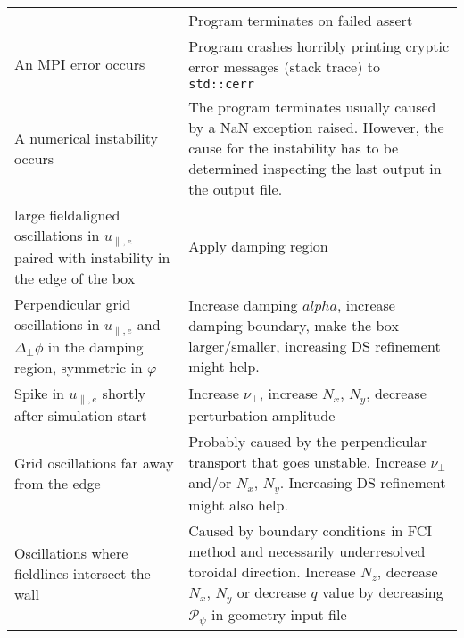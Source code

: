 \begin{longtable}{p{6cm}p{8cm}}
&
Program terminates on failed assert
    \\
An MPI error occurs
&
Program crashes horribly printing cryptic error messages (stack trace) to \texttt{std::cerr}
    \\
A numerical instability occurs
&
The program terminates usually caused by a NaN exception raised. However,
the cause for the instability has to be determined inspecting the
last output in the output file.
    \\
\qquad large fieldaligned oscillations in $u_{\parallel,e}$ paired with instability in the edge of the box
&
Apply damping region
    \\
\qquad Perpendicular grid oscillations in $u_{\parallel,e}$ and $\Delta_\perp \phi$ in the damping region, symmetric in $\varphi$
&
Increase damping $alpha$, increase damping boundary, make the box larger/smaller, increasing DS refinement might help.
    \\
\qquad Spike in $u_{\parallel,e}$ shortly after simulation start
&
Increase $\nu_\perp$, increase $N_x$, $N_y$, decrease perturbation amplitude
    \\
\qquad Grid oscillations far away from the edge
&
Probably caused by the perpendicular transport that goes unstable. Increase $\nu_\perp$ and/or $N_x$, $N_y$. Increasing DS refinement might also help.
\\
\qquad Oscillations where fieldlines intersect the wall
&
Caused by boundary conditions in FCI method and necessarily underresolved toroidal direction.
Increase $N_z$, decrease $N_x$, $N_y$ or decrease $q$ value by decreasing $\mathcal P_\psi$ in geometry input file
\\
\bottomrule
\end{longtable}





